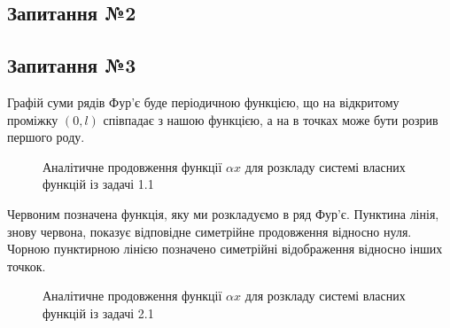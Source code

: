 \documentclass[a4paper, 14pt]{extreport}
\begin{document}
\subsection{Запитання №2}


\subsection{Запитання №3} 
Графій суми рядів Фур'є буде періодичною функцією, що на відкритому проміжку $(0,l)$ співпадає з нашою функцією, а на в точках може бути розрив першого роду.


\begin{figure} \label{fourier1}
    \caption{Аналітичне продовження функції $\alpha x$ для розкладу системі власних функцій із задачі 1.1}
\end{figure}

Червоним позначена функція, яку ми розкладуємо в ряд Фур'є. Пунктина лінія, знову червона, показує відповідне симетрійне продовження відносно нуля. Чорною пунктирною лінією позначено симетрійні відображення відносно інших точкок.

\begin{figure} \label{fourier2}
    \caption{Аналітичне продовження функції $\alpha x$ для розкладу системі власних функцій із задачі 2.1}
\end{figure}
\end{document}
